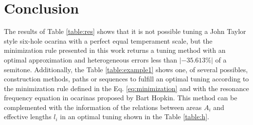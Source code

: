 \documentclass[11pt,twocolumn]{article}
\begin{document}
\begin{table}[h]
\center
{}
\caption{Proposed tuning method.}
\label{table:example1}
\end{table}


\section{Conclusion}
The results of Table \ref{table:res} shows that it is not possible tuning a John Taylor style six-hole ocarina with a perfect equal temperament scale,
but the minimization rule presented in this work returns a tuning method with an optimal approximation and heterogeneous errors less than $|-35.613\%|$ of a semitone.
Additionally, the Table \ref{table:example1} shows one, of several possibles, construction methods, 
paths or sequences to fulfill an optimal tuning according to the minimization rule defined in the Eq. \ref{eq:minimization} and with 
the resonance frequency equation in ocarinas proposed by Bart Hopkin.
This method can be complemented with the information of the relations between areas $A_i$ and effective lengths $l_i$ 
in an optimal tuning shown in the Table \ref{table:h}.


\printbibliography


\end{document}
